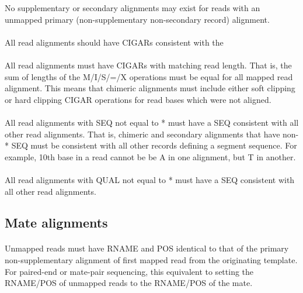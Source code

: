 \documentclass[10pt]{article}
\begin{document}
No supplementary or secondary alignments may exist for reads with an
unmapped primary (non-supplementary non-secondary record) alignment.

\paragraph{}

All read alignments should have CIGARs consistent with the 

\paragraph{}

All read alignments must have CIGARs with matching read length. That is,
the sum of lengths of the M/I/S/=/X operations must be equal for all mapped read alignment.
This means that chimeric alignments must include either soft clipping or
hard clipping CIGAR operations for read bases which were not aligned.

\paragraph{}

All read alignments with SEQ not equal to * must have a SEQ consistent
with all other read alignments. That is, chimeric and secondary alignments that have non-* SEQ
must be consistent with all other records defining a segment sequence. For
example, 10th base in a read cannot be be A in one alignment, but T in another.

\paragraph{}

All read alignments with QUAL not equal to * must have a SEQ consistent
with all other read alignments.

\subsection{Mate alignments}

\paragraph{}

Unmapped reads must have RNAME and POS identical to that of the primary
non-supplementary alignment of first mapped read from the originating template.
For paired-end or mate-pair sequencing, this equivalent
to setting the RNAME/POS of unmapped reads to the RNAME/POS of the mate.
\end{document}
